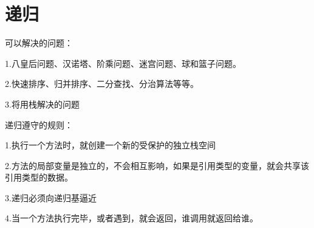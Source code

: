 \documentclass[a4paper]{report}
\begin{document}
\chapter{递归}

可以解决的问题：

1.八皇后问题、汉诺塔、阶乘问题、迷宫问题、球和篮子问题。

2.快速排序、归并排序、二分查找、分治算法等等。

3.将用栈解决的问题

递归遵守的规则：

1.执行一个方法时，就创建一个新的受保护的独立栈空间

2.方法的局部变量是独立的，不会相互影响，如果是引用类型的变量，就会共享该引用类型的数据。

3.递归必须向递归基逼近

4.当一个方法执行完毕，或者遇到，就会返回，谁调用就返回给谁。
\end{document}
